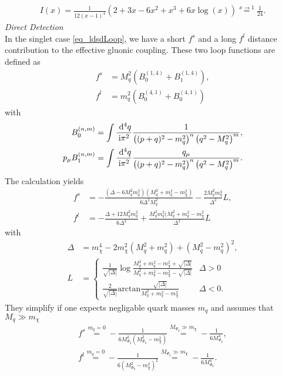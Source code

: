 \begin{appendix}
\begin{align}
 I(x) = \frac{1}{12(x-1)^4}\left(2+3x-6x^2+x^3+6x\log(x) \right) \stackrel{x\rightarrow1}{=} \frac{1}{24}.
 \label{eq_loopmuon}
\end{align}
\textit{Direct Detection}\\
\noindent In the singlet case \eqref{eq_ldsdLoop}, we have a short $f^s$ and a long $f^l$ distance contribution to the effective gluonic coupling. These two loop functions
are defined as \cite{1007.2601}
\begin{align}
 f^s &= M_q^2(B_0^{(1,4)} + B_1^{(1,4)}),\\
 f^l &= m_q^2(B_0^{(4,1)} + B_0^{(4,1)})
 \label{eq_singletloop}
\end{align}
with
\begin{align}
 B_0^{(n,m)} &= \int \frac{\; \mathrm{d}^4 q}{\text{i} \pi^2}\frac{1}{\left((p+q)^2-m_q^2\right)^n\left(q^2-M^2_q\right)^m},\\
 p_\mu B_1^{(n,m)} &= \int \frac{\; \mathrm{d}^4 q}{\text{i} \pi^2}\frac{q_\mu}{\left((p+q)^2-m_q^2\right)^n\left(q^2-M^2_q\right)^m}.
\end{align}
The calculation yields
\begin{align}
 f^s &=-\frac{(\Delta-6M_q^2m_q^2)(M_q^2+m_q^2-m_\chi^2)}{6\Delta^2M_q^2} - \frac{2M_q^2m_q^4}{\Delta^2}L,\\
 f^l &=-\frac{\Delta+12M_q^2m_q^2}{6\Delta^2} + \frac{M_q^2m_q^2(M_q^2+m_q^2-m_\chi^2}{\Delta^2}L
\end{align}
with
\begin{align}
 \Delta &= m_\chi^4-2m_\chi^2(M_q^2+m_q^2) + (M_q^2-m_q^2)^2,\\
 L&= \begin{cases} \frac{1}{\sqrt{|\Delta|}}\log\frac{M_q^2+m_q^2-m_\chi^2+\sqrt{|\Delta|}}{M_q^2+m_q^2-m_\chi^2-\sqrt{|\Delta|}} & \Delta>0\\ 
		  \frac{2}{\sqrt{|\Delta|}}\text{arctan}\frac{\sqrt{|\Delta|}}{M_q^2+m_q^2-m_\chi^2} &\Delta<0.   
     \end{cases}
\end{align}
They simplify if one expects negligable quark masses $m_q$ and assumes that $M_q \gg m_\chi$
\begin{align}
 f^s \stackrel{m_q=0}{=} - \frac{1}{6M_{\Phi_q}^2\left(M_{\Phi_q}^2-m_\chi^2\right)} \stackrel{M_{\Phi_q}\gg m_\chi}{=} -\frac{1}{6M_{\Phi_q}^4},\\
 f^l \stackrel{m_q=0}{=} - \frac{1}{6\left(M_{\Phi_q}^2-m_\chi^2\right)^2}  \stackrel{M_{\Phi_q}\gg m_\chi}{=} -\frac{1}{6M_{\Phi_q}^4}.
\end{align}

 
\end{appendix}